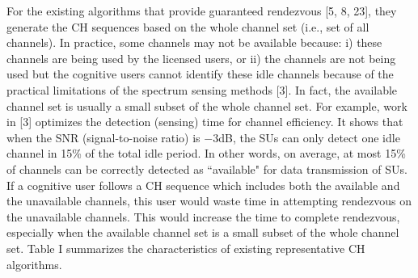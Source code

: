 \documentclass[journal]{IEEEtran}
\begin{document}
\par For the existing algorithms that provide guaranteed rendezvous [5, 8, 23], they generate the CH sequences based on the whole channel set (i.e., set of all channels). In practice, some channels may not be available because: i) these channels are being used by the licensed users, or ii) the channels are not being used but the cognitive users cannot identify these idle channels because of the practical limitations of the spectrum sensing methods [3]. In fact, the available channel set is usually a small subset of the whole channel set. For example, work in [3] optimizes the detection (sensing) time for channel efficiency. It shows that when the SNR (signal-to-noise ratio) is $-3$dB, the SUs can only detect one idle channel in 15\% of the total idle period. In other words, on average, at most 15\% of channels can be correctly detected as ``available" for data transmission of SUs. If a cognitive user follows a CH sequence which includes both the available and the unavailable channels, this user would waste time in attempting rendezvous on the unavailable channels. This would increase the time to complete rendezvous, especially when the available channel set is a small subset of the whole channel set. Table I summarizes the characteristics of existing representative CH algorithms.
\end{document}

